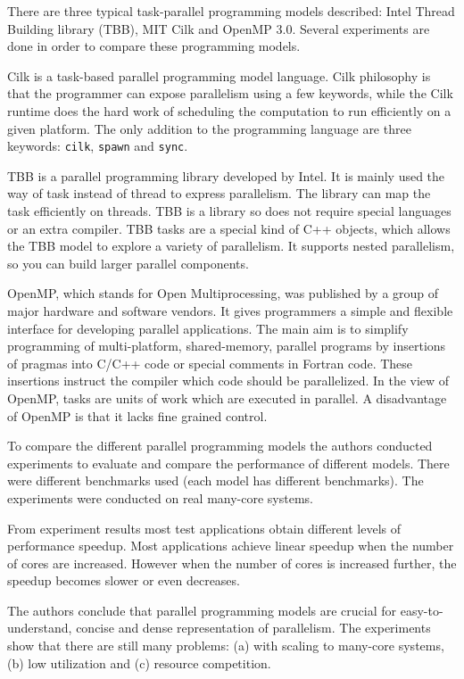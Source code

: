 There are three typical task-parallel programming models described: Intel
Thread Building library (TBB), MIT Cilk and OpenMP 3.0. Several experiments are
done in order to compare these programming models.

Cilk is a task-based parallel programming model language. Cilk philosophy is
that the programmer can expose parallelism using a few keywords, while the Cilk
runtime does the hard work of scheduling the computation to run efficiently on
a given platform. The only addition to the programming language are three
keywords: \texttt{cilk}, \texttt{spawn} and \texttt{sync}.

TBB is a parallel programming library developed by Intel. It is mainly used the
way of task instead of thread to express parallelism. The library can map the
task efficiently on threads. TBB is a library so does not require special
languages or an extra compiler. TBB tasks are a special kind of C++ objects,
which allows the TBB model to explore a variety of parallelism. It supports
nested parallelism, so you can build larger parallel components.

OpenMP, which stands for Open Multiprocessing, was published by a group of
major hardware and software vendors. It gives programmers a simple and flexible
interface for developing parallel applications. The main aim is to simplify
programming of multi-platform, shared-memory, parallel programs by insertions
of pragmas into C/C++ code or special comments in Fortran code. These
insertions instruct the compiler which code should be parallelized. In the view
of OpenMP, tasks are units of work which are executed in parallel. A
disadvantage of OpenMP is that it lacks fine grained control.

To compare the different parallel programming models the authors conducted
experiments to evaluate and compare the performance of different models. There
were different benchmarks used (each model has different benchmarks). The
experiments were conducted on real many-core systems.

From experiment results most test applications obtain different levels of
performance speedup. Most applications achieve linear speedup when the number
of cores are increased. However when the number of cores is increased further,
the speedup becomes slower or even decreases.

The authors conclude that parallel programming models are crucial for
easy-to-understand, concise and dense representation of parallelism. The
experiments show that there are still many problems: (a) with scaling to
many-core systems, (b) low utilization and (c) resource competition.

